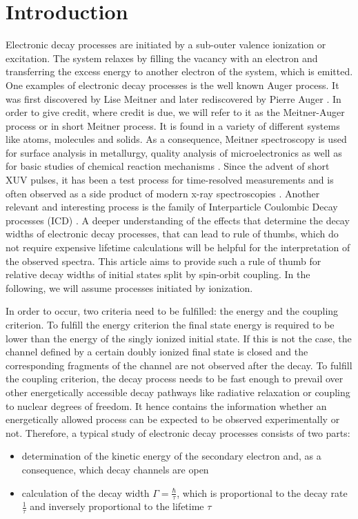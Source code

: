 \documentclass[aps,amssymb,preprint,a4paper]{revtex4}
\begin{document}
\section{Introduction}
Electronic decay processes are initiated by a sub-outer valence ionization
or excitation. The system relaxes by filling the vacancy with an electron and
transferring the excess energy to another electron of the system, which is emitted.
One examples of electronic decay processes is the
well known Auger process. It was first discovered
by Lise Meitner \cite{Meitner22} and later rediscovered
by Pierre Auger \cite{Auger23}. In order to give credit, where credit is due,
we will refer to it as the Meitner-Auger process or in short Meitner process.
It is found in a variety of different systems like atoms, molecules and solids.
As a consequence, Meitner spectroscopy
is used for surface analysis in metallurgy,
quality analysis of microelectronics
as well as for basic studies of chemical reaction mechanisms \cite{AES_Seah_86}.
Since the advent of short XUV pulses, it has been a test process for
time-resolved measurements \cite{Smirnova03}
and is often observed as a side product of modern x-ray spectroscopies
\cite{Greczynski20}.
Another relevant and interesting process is the family of Interparticle
Coulombic Decay processes (ICD) \cite{Cederbaum97,Hergenhahn11,Jahnke15}.
A deeper understanding of the effects that determine the decay widths
of electronic decay processes, that
can lead to rule of thumbs, which do not require expensive lifetime
calculations will
be helpful for the interpretation of the observed spectra.
This article aims to provide such a rule of thumb for relative decay widths
of initial states split by spin-orbit coupling.
In the following, we will assume processes initiated by ionization.

In order to occur, two criteria need to be fulfilled: the energy and the coupling
criterion.
To fulfill the energy criterion the final state energy is required
to be lower than
the energy of the singly ionized initial state. If this is not the case, the
channel defined by a certain doubly ionized final state
is closed and the corresponding fragments of the
channel are not observed after the decay.
To fulfill the coupling criterion, the decay process needs to be fast enough
to prevail over other energetically accessible decay pathways like radiative
relaxation or coupling to nuclear degrees of freedom.
It hence contains
the information whether an energetically allowed process can be expected
to be observed experimentally or not.
Therefore, a typical study of electronic decay processes consists of two parts:
\begin{itemize}
 \item determination of the kinetic energy of the secondary electron
       and, as a consequence, which decay channels are open
 \item calculation of the decay width $\Gamma=\frac{\hbar}{\tau}$, which
       is proportional to the decay rate $\frac{1}{\tau}$ and
       inversely proportional to the lifetime $\tau$
\end{itemize}
\end{document}
